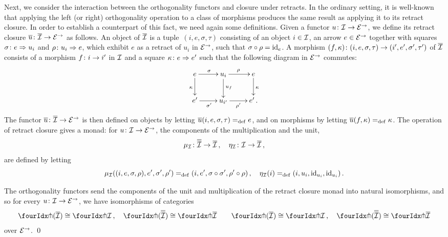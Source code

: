 \documentclass[reqno,10pt,a4paper,oneside]{amsart}
\begin{document}
\medskip

Next, we consider the interaction between the orthogonality functors and closure under retracts. In the ordinary setting, it is well-known that
applying the left (or right) orthogonality operation to a class of morphisms produces the same result as applying it to its retract closure. 
In order to establish a counterpart of this fact, we need again some definitions. 
Given a  functor $u \co \cal{I} \to \catE^{\to}$, we define its retract closure $\overline{u} \co \overline{\cal{I}} \to \catE^{\to}$ as follows. 
An object of $\overline{\cal{I}}$ is a tuple~$(i, e, \sigma, \tau)$ consisting of an object $i \in \cal{I}$, an arrow $e \in \cal{E}^\to$ together with squares $\sigma \co e \Rightarrow u_i$ and $\rho \co u_i \Rightarrow e$,
which exhibit $e$ as a retract of $u_i$ in  $\catE^{\to}$,  \ie such that $\sigma \cc \rho = \id_e$. 
A morphism $(f, \kappa) \co (i, e, \sigma, \tau) \to (i', e', \sigma', \tau')$ of $\overline{\cal{I}}$  consists of a morphism $f \co i \to i'$ in $\cal{I}$ and a square $\kappa \co e \Rightarrow e'$  such that the following diagram in $\cal{E}^\to$ commutes:
\[
\xymatrix{
  e
  \ar[r]^{\sigma}
    \ar[d]_{\kappa}
&
  u_i
  \ar[r]^{\rho}
  \ar[d]^{u_f}
&
  e
  \ar[d]^{\kappa}
\\
  e'
  \ar[r]_{\sigma'}
&
  u_{i'}
  \ar[r]_{\rho'}
&
  e' \, .
}
\]
The functor $\overline{u} \co \overline{\cal{I}} \to \catE^\to$ is then defined  on objects  by letting 
$\overline{u}(i, e, \sigma, \tau) \defeq e$,
and on morphisms by letting $\overline{u}(f, \kappa) \defeq \kappa$. The operation of retract closure gives a monad: for $u \co \cal{I} \to \catE^{\to}$,
the components of the multiplication and the unit, 
\[
\mu_\cal{I} \co \overline{\overline{\cal{I}}} \to \overline{\cal{I}} \, , \quad
\eta_\cal{I} \co \cal{I} \to \overline{\cal{I}} \, ,
\]
are defined by letting
\[
\mu_\cal{I}((i, e, \sigma,  \rho), e', \sigma', \rho') \defeq (i, e', \sigma \cc \sigma', \rho' \cc \rho) \, , \quad
\eta_\cal{I}(i) \defeq (i, u_i, \id_{u_i}, \id_{u_i}) \, .
\]




\begin{proposition}
\label{retract-closure}
The orthogonality functors send the components of the unit and multiplication of the retract closure monad into natural
isomorphisms, and so for every $u \co \cal{I} \to \catE^\to$, we have isomorphisms of categories
\begin{gather*} 
 \liftr{(\overline{\cal{I}})} \iso \liftr{\cal{I}} \, , \quad
 \liftr{(\overline{\overline{\cal{I}}})} \iso \liftr{\overline{\cal{I}}}  \qquad
 \liftl{(\overline{\cal{I}})} \iso \liftl{\cal{I}} \, , \quad
 \liftl{(\overline{\overline{\cal{I}}})} \iso \liftl{\overline{\cal{I}}}
\end{gather*} 
over $\catE^\to$. \qed
\end{proposition}
\end{document}
